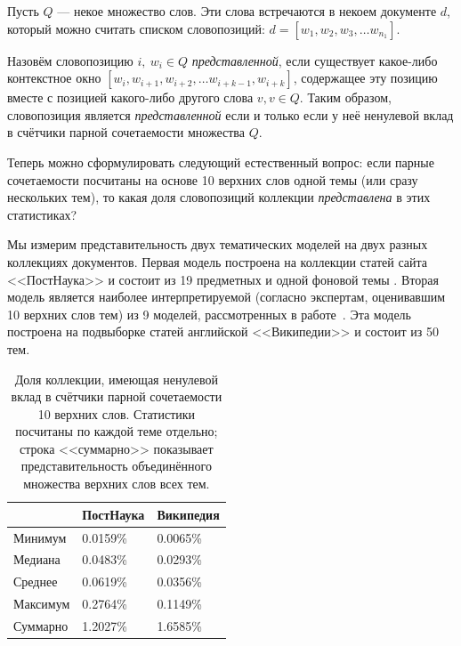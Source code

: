 Пусть $Q$ --- некое множество слов. Эти слова встречаются в некоем документе $d$, который можно считать списком словопозиций: $d = [w_1, w_2, w_3, \dots w_{n_1}]$.

Назовём словопозицию $i, ~w_i \in Q$ \textit{представленной}, если существует какое-либо контекстное окно $[w_i, w_{i+1}, w_{i+2}, \dots w_{i+k-1}, w_{i+k}]$, содержащее эту позицию вместе с позицией какого-либо другого слова $v, v \in Q$. Таким образом, словопозиция является \textit{представленной} если и только если у неё ненулевой вклад в счётчики парной сочетаемости множества $Q$.

Теперь можно сформулировать следующий естественный вопрос: если парные сочетаемости посчитаны на основе 10 верхних слов одной темы (или сразу нескольких тем), то какая доля словопозиций коллекции \textit{представлена} в этих статистиках?




Мы измерим представительность двух тематических моделей на двух разных коллекциях документов. Первая модель построена на коллекции статей сайта <<ПостНаука>> и состоит из 19 предметных и одной фоновой темы \cite{irina}. Вторая модель является наиболее интерпретируемой (согласно экспертам, оценивавшим 10 верхних слов тем) из 9 моделей, рассмотренных в работе~\cite{rtl}. Эта модель построена на подвыборке статей английской <<Википедии>> и состоит из 50 тем.

\begin{table}[ht]
\begin{tabular}{|l|l|l|} \hline
         & ПостНаука & Википедия \\ \hline
Минимум  & 0.0159\%  & 0.0065\%  \\ \hline
Медиана  & 0.0483\%  & 0.0293\%  \\ \hline
Среднее  & 0.0619\%  & 0.0356\%  \\ \hline
Максимум & 0.2764\%  & 0.1149\%  \\ \hline
Суммарно & 1.2027\%  & 1.6585\%  \\ \hline
\end{tabular}
    \caption{
      Доля коллекции, имеющая ненулевой вклад в счётчики парной сочетаемости 10 верхних слов. Статистики посчитаны по каждой теме отдельно; строка <<суммарно>> показывает представительность объединённого множества верхних слов всех тем.
    }
    \label{table:represented}
\end{table}


